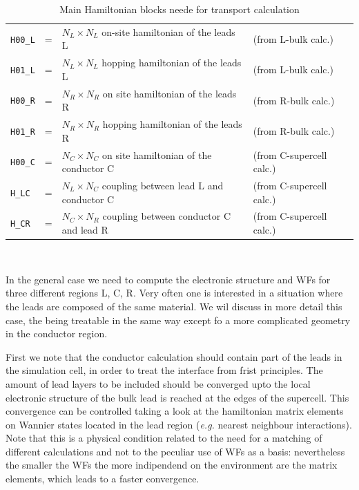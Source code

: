 %
%
\begin{table}[h]
%
\begin{tabular}{lllll}
\texttt{H00\_L} &=& $N_L\times N_L$ on-site hamiltonian
of the leads L & (from L-bulk calc.)\\
\texttt{H01\_L} &=& $N_L\times N_L$ hopping hamiltonian
of the leads L & (from L-bulk calc.) \\
\texttt{H00\_R} &=& $N_R\times N_R$ on site hamiltonian
of the leads R & (from R-bulk calc.) \\
\texttt{H01\_R} &=& $N_R\times N_R$ hopping hamiltonian
of the leads R & (from R-bulk calc.) \\
\texttt{H00\_C} &=& $N_C\times N_C$ on site hamiltonian
of the conductor C & (from C-supercell calc.) \\
\texttt{H\_LC}  &=& $N_L\times N_C$ coupling
between lead L and conductor C & (from C-supercell calc.) \\
\texttt{H\_CR}  &=& $N_C\times N_R$ coupling
between conductor C and lead R & (from C-supercell calc.)
%
%
\end{tabular} \\
%
\caption {Main Hamiltonian blocks neede for transport calculation 
          \label{tab:hamiltonian_blocks} }
\end{table}
%
%
%
\noindent
In the general case we need to compute the electronic structure and
WFs for three different regions L, C, R.
Very often one is interested in a situation where the leads are composed
of the same material. We wil discuss in more detail this case, the being 
treatable in the same way except fo a more complicated geometry in the
conductor region.

First we note that the conductor calculation should contain part of the leads
in the simulation cell, in order to treat the interface from frist principles.
The amount of lead layers to be included should be converged upto the local 
electronic structure of the bulk lead is reached at the edges of the supercell.
This convergence can be controlled taking a look at the 
hamiltonian matrix elements 
on Wannier states located in the lead region
({\it e.g.} nearest neighbour interactions).
Note that this is a physical condition related to the need for a matching of different
calculations and not to the peculiar use of WFs as a basis: nevertheless the smaller
the WFs the more indipendend on the environment are the matrix elements, which leads
to a faster convergence.

